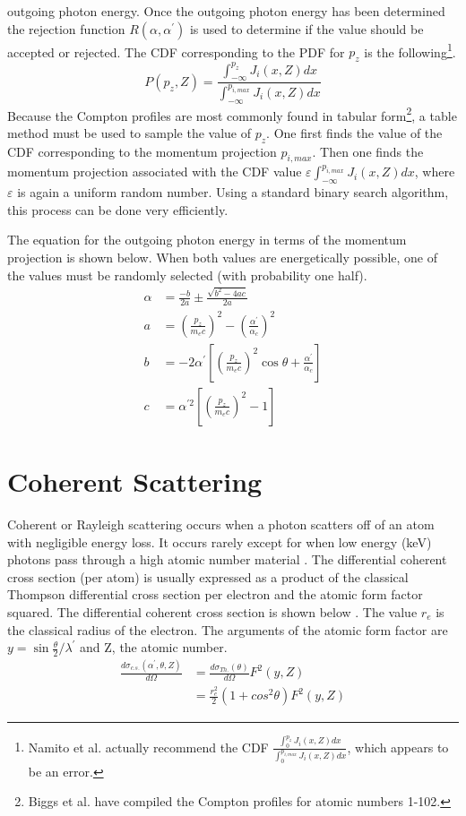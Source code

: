 outgoing photon energy. Once the outgoing photon energy has been determined
the rejection function $R(\alpha,\alpha^{'})$ is used to determine if the value 
should be accepted or rejected. The CDF corresponding to the PDF for $p_z$ is 
the following\footnote{Namito et al. actually recommend the CDF $\frac{\int_{0}^{p_z}J_i(x,Z)dx}{\int_{0}^{p_{i,max}}J_i(x,Z)dx}$, which appears to be an error.}.
\begin{equation}
P(p_z,Z) = \frac{\int_{-\infty}^{p_z}J_i(x,Z)dx}{\int_{-\infty}^{p_{i,max}}J_i(x,Z)dx}
\end{equation}
Because the Compton profiles are most commonly found in tabular form\footnote{Biggs et al. have compiled the Compton profiles for atomic numbers 1-102\citep{biggs_hartree-fock_1975}.}, a table method must be used to sample the value of 
$p_z$. One first finds the value of the CDF corresponding to the momentum 
projection $p_{i,max}$. Then one finds the momentum projection associated with 
the CDF value $\varepsilon\int_{-\infty}^{p_{i,max}}J_i(x,Z)dx$, where $\varepsilon$ 
is again a uniform random number. Using a standard binary search algorithm, 
this process can be done very efficiently.

The equation for the outgoing photon energy in terms of the momentum projection
is shown below. When both values are energetically possible, one of the values
must be randomly selected (with probability one half).
\begin{align}
  \alpha & = \frac{-b}{2a} \pm \frac{\sqrt{b^2 - 4ac}}{2a} \\
  a & = \left(\frac{p_z}{m_ec}\right)^2 - 
  \left(\frac{\alpha^{'}}{\alpha_c}\right)^2
  \nonumber \\
  b & = -2\alpha^{'}\left[\left(\frac{p_z}{m_ec}\right)^2\cos{\theta} + 
  \frac{\alpha^{'}}{\alpha_c}\right] \nonumber \\
  c & = \alpha^{'2}\left[\left(\frac{p_z}{m_ec}\right)^2 - 1\right] \nonumber
\end{align}


\section{Coherent Scattering}
\label{sec:coherent_scattering}
Coherent or Rayleigh scattering occurs when a photon scatters off of an atom 
with negligible energy loss. It occurs rarely except for when low energy (keV)
photons pass through a high atomic number material 
\citep{lux_monte_1991}. The differential coherent cross section (per atom) is 
usually expressed as a product of the classical Thompson differential 
cross section per electron and the atomic form factor squared. The differential 
coherent cross section is shown below \citep{lux_monte_1991}. The value $r_e$ 
is the classical radius of the electron. The arguments of the atomic form factor
are $y = \sin{\frac{\theta}{2}}/\lambda^{'}$ and Z, the atomic number. 
\begin{align}
  \frac{d\sigma_{c.s.}(\alpha^{'},\theta,Z)}{d\Omega} & = 
  \frac{d\sigma_{Th.}(\theta)}{d\Omega}F^2(y,Z) \nonumber \\
  & = \frac{r_e^2}{2}(1 + cos^2\theta)F^2(y,Z)
\end{align}

